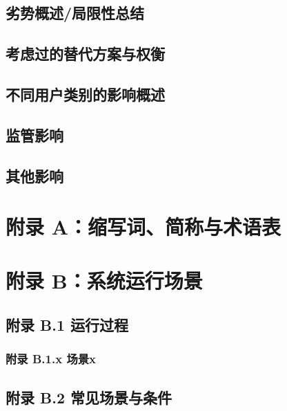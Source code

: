 \documentclass{ctexart}
\begin{document}
\subsection{劣势概述/局限性总结}

\subsection{考虑过的替代方案与权衡}

\subsection{不同用户类别的影响概述}

\subsection{监管影响}

\subsection{其他影响}

\newpage
\section{附录 A：缩写词、简称与术语表}

\newpage
\section{附录 B：系统运行场景}

\subsection{附录 B.1 运行过程}

\subsubsection{附录 B.1.x 场景x}

\subsection{附录 B.2 常见场景与条件}
\end{document}
